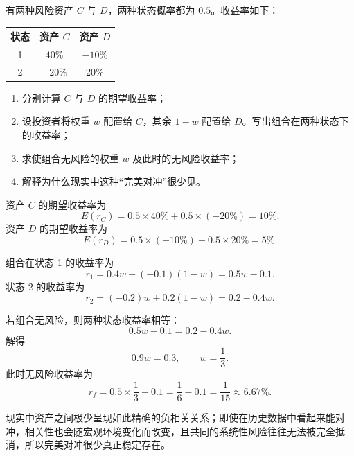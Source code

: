 \begin{question}
有两种风险资产 $C$ 与 $D$，两种状态概率都为 $0.5$。收益率如下：

\begin{center}
\begin{tabular}{c|cc}
状态 & 资产 $C$ & 资产 $D$\\ \hline
1 & $40\%$ & $-10\%$\\
2 & $-20\%$ & $20\%$
\end{tabular}
\end{center}

\begin{enumerate}[label=(\arabic*),leftmargin=2.5em]
  \item 分别计算 $C$ 与 $D$ 的期望收益率；
  \item 设投资者将权重 $w$ 配置给 $C$，其余 $1-w$ 配置给 $D$。写出组合在两种状态下的收益率；
  \item 求使组合无风险的权重 $w$ 及此时的无风险收益率；
  \item 解释为什么现实中这种“完美对冲”很少见。
\end{enumerate}

\begin{solution}
资产 $C$ 的期望收益率为
\[
E(r_C)=0.5\times 40\%+0.5\times (-20\%)=10\%.
\]
资产 $D$ 的期望收益率为
\[
E(r_D)=0.5\times (-10\%)+0.5\times 20\%=5\%.
\]

组合在状态 1 的收益率为
\[
r_1=0.4w+(-0.1)(1-w)=0.5w-0.1.
\]
状态 2 的收益率为
\[
r_2=(-0.2)w+0.2(1-w)=0.2-0.4w.
\]

若组合无风险，则两种状态收益率相等：
\[
0.5w-0.1=0.2-0.4w.
\]
解得
\[
0.9w=0.3,\qquad w=\frac13.
\]
此时无风险收益率为
\[
r_f=0.5\times \frac13-0.1=\frac16-0.1=\frac{1}{15}\approx 6.67\%.
\]

现实中资产之间极少呈现如此精确的负相关关系；即使在历史数据中看起来能对冲，相关性也会随宏观环境变化而改变，且共同的系统性风险往往无法被完全抵消，所以完美对冲很少真正稳定存在。
\end{solution}
\end{question}

